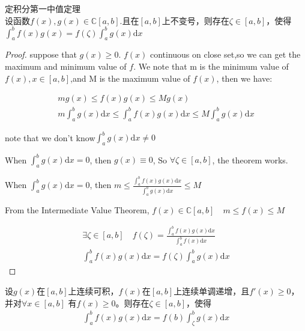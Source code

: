 \date{20.08.11}
\begin{theorem}	定积分第一中值定理\\
设函数$ f(x),g(x) \in \mathbb{C}[a,b]. $且在$ [a,b] $上不变号，则存在$ \zeta \in  [a,b]$，使得$ \int_{a}^{b}f(x)g(x) = f(\zeta)\int_{a}^bg(x)\text{d}x $

\end{theorem}
\begin{proof}
suppose that $ g(x)\ge 0 $. $ f(x) $ continuous on close set,so we can get the maximum and minimum value of $ f $. We note that m is the minimum value of $f(x), x\in [a,b] $,and M is the maximum value of $ f(x) $, then we have:

\begin{align*}
	mg(x) \leqslant f(x)g(x) \leqslant Mg(x)\\
	m\int_{a}^{b}g(x)\text{d}x \leqslant \int_{a}^{b}f(x)g(x)\text{d}x\leqslant M\int_{a}^{b}g(x)\text{d}x
\end{align*}

note that we don't know$ \int_{a}^{b}g(x)\text{d}x \neq 0$

When $ \int_{a}^{b}g(x)\text{d}x = 0$, then $ g(x) \equiv 0 $, So $ \forall \zeta \in [a,b] $, the theorem works.

When $ \int_{a}^{b}g(x)\text{d}x = 0$, then $ m\leqslant \frac{\int_{a}^{b}f(x)g(x)\text{d}x}{\int_{a}^{b}g(x)\text{d}x} \leq M $

From the Intermediate Value Theorem, $ f(x) \in \mathbb{C}[a, b] \quad m\leqslant f(x) \leqslant M $

\begin{align*}
	\exists \zeta \in [a,b] \quad f(\zeta) = \frac{\int_{a}^{b}f(x)g(x)\text{d}x}{\int_{a}^{b}f(x)\text{d}x}\\
	\int_{a}^{b}f(x)g(x)\text{d}x = f(\zeta)\int_{a}^{b}g(x)\text{d}x
\end{align*}

\end{proof}

设$ g(x) $在$ [a,b] $上连续可积，$ f(x) $在$ [a,b] $上连续单调递增，且$ f'(x) \ge 0 $，并对$ \forall x\in [a,b] $ 有$ f(x)\ge 0 $。则存在$ \zeta \in [a,b] $，使得
\begin{align*}
\int_{a}^{b}f(x)g(x)\text{d}x = f(b)\int_{\zeta}^{b}g(x)\text{d}x
\end{align*}


